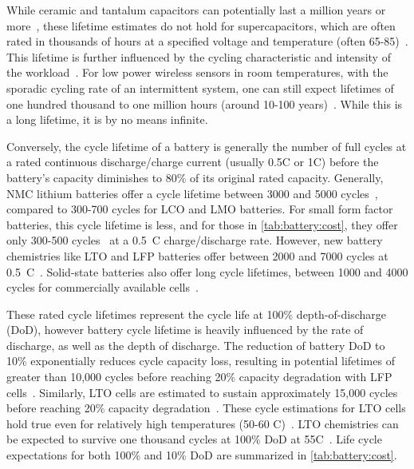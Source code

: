 While ceramic and tantalum capacitors can potentially last a million years or more~\cite{kemetLife}, these lifetime estimates do not hold for supercapacitors, which are often rated in thousands of hours at a specified voltage and temperature (often 65-85\ssi{\celsius})~\cite{bestCap,murataCap}. This lifetime is further influenced by the cycling characteristic and intensity of the workload~\cite{kreczanik2013study}. For low power wireless sensors in room temperatures, with the sporadic cycling rate of an intermittent system, one can still expect lifetimes of one hundred thousand to one million hours (around 10-100 years)~\cite{kreczanik2013study}. While this is a long lifetime, it is by no means infinite.

Conversely, the cycle lifetime of a battery is generally the number of full cycles at a rated continuous discharge/charge current (usually 0.5C or 1C) before the battery's capacity diminishes to 80\% of its original rated capacity.
Generally, NMC lithium batteries offer a cycle lifetime between 3000 and 5000 cycles~\cite{richter2017measurements,preger2020degradation}, compared to 300-700 cycles for LCO and LMO batteries.
For small form factor batteries, this cycle lifetime is less, and for those in \cref{tab:battery:cost}, they offer only 300-500 cycles~\cite{lipoDatasheet, millibatNimbus} at a 0.5~C charge/discharge rate.
However, new battery chemistries like LTO and LFP batteries offer between 2000 and 7000 cycles at 0.5~C~\cite{hallExperimental18, LTODatasheet, LTODatasheet2,omarLithium14, sarasketaCycle15, wangCycle11,lifepo4Datasheet, preger2020degradation}. Solid-state batteries also offer long cycle lifetimes, between 1000 and 4000 cycles for commercially available cells~\cite{stEnfilm,tdkCeraCharge}.

These rated cycle lifetimes represent the cycle life at 100\% depth-of-discharge (DoD), however battery cycle lifetime is heavily influenced by the rate of discharge, as well as the depth of discharge.
The reduction of battery DoD to 10\%
exponentially reduces cycle capacity loss, resulting in potential
lifetimes of greater than 10,000 cycles before reaching 20\% capacity degradation with LFP cells~\cite{omarLithium14, wangCycle11}. Similarly, LTO cells are estimated to sustain approximately 15,000 cycles before reaching 20\% capacity degradation~\cite{stroe2018accelerated}.
These cycle estimations for LTO cells hold true even for relatively high temperatures (50-60\textdegree
C)~\cite{wangCycle11, stroe2018accelerated}.
LTO chemistries can be expected to survive one thousand
cycles at 100\% DoD at 55\textdegree C~\cite{han2014cycle}.
Life cycle
expectations for both 100\% and 10\% DoD are summarized in
\cref{tab:battery:cost}.

